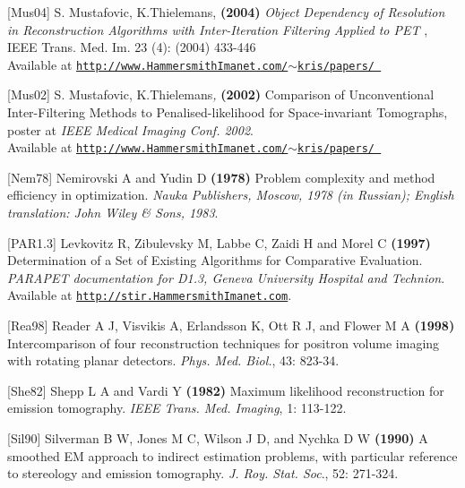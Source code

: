 \documentclass{article}
\def\R2Lurl#1#2{\mbox{\href{#1}{\tt #2}}}
\begin{document}
{[}Mus04] S. Mustafovic, K.Thielemans, \textbf{(200}\textbf{4}\textbf{)} \textit{Object 
Dependency of Resolution in Reconstruction Algorithms with Inter-Iteration 
Filtering Applied to PET} , IEEE Trans. Med. Im. 23 (4): (2004) 
433-446\\
Available at \R2Lurl{http://www.HammersmithImanet.com/\ensuremath{\sim}kris/papers/}{http://www.HammersmithImanet.com/\ensuremath{\sim}kris/papers/ }


{[}Mus02] S. Mustafovic, K.Thielemans\textit{,} \textbf{(2002)}  Comparison 
of Unconventional Inter-Filtering Methods to Penalised-likelihood 
for Space-invariant Tomographs, poster at \textit{IEEE Medical Imaging 
Conf. 2002}. \\
Available at \R2Lurl{http://www.HammersmithImanet.com/\ensuremath{\sim}kris/papers/}{http://www.HammersmithImanet.com/\ensuremath{\sim}kris/papers/ }


{[}Nem78] Nemirovski A and Yudin D \textbf{(1978)} Problem complexity 
and method efficiency in optimization. \textit{Nauka Publishers, 
Moscow, 1978 (in Russian); English translation: John Wiley \& 
Sons, 1983}.


 {[}PAR1.3] Levkovitz R, Zibulevsky M, Labbe C, Zaidi H and Morel 
C \textbf{(1997)} Determination of a Set of Existing Algorithms for 
Comparative Evaluation. \textit{PARAPET documentation for D1.3, Geneva 
University Hospital and Technion}. \\
Available at \R2Lurl{http://stir.HammersmithImanet.com }{http://stir.HammersmithImanet.com}. 



 {[}Rea98] Reader A J, Visvikis A, Erlandsson K, Ott R J, and Flower 
M A \textbf{(1998)} Intercomparison of four reconstruction techniques 
for positron volume imaging with rotating planar detectors. \textit{Phys. 
Med. Biol.}, 43: 823-34.


{[}She82] Shepp L A and Vardi Y \textbf{(1982)} Maximum likelihood reconstruction 
for emission tomography. \textit{IEEE Trans. Med. Imaging}, 1: 113-122.


{[}Sil90] Silverman B W, Jones M C, Wilson J D, and Nychka D W \textbf{(1990)} 
A smoothed EM approach to indirect estimation problems, with 
particular reference to stereology and emission tomography. \textit{J. 
Roy. Stat. Soc}., 52: 271-324. 
\end{document}
